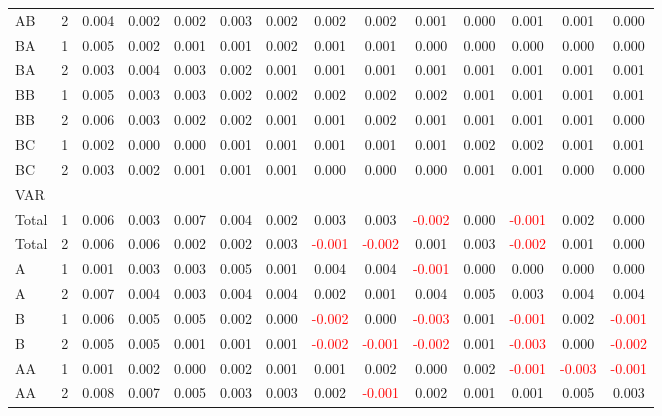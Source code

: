 \begin{table}[H]
{\begin{tabular}{llcccccccccccc}
AB & 2 & 0.004 & 0.002 & 0.002 & 0.003 & 0.002 & 0.002 & 0.002 & 0.001 & 0.000 & 0.001 & 0.001 & 0.000\\
BA & 1 & 0.005 & 0.002 & 0.001 & 0.001 & 0.002 & 0.001 & 0.001 & 0.000 & 0.000 & 0.000 & 0.000 & 0.000\\
BA & 2 & 0.003 & 0.004 & 0.003 & 0.002 & 0.001 & 0.001 & 0.001 & 0.001 & 0.001 & 0.001 & 0.001 & 0.001\\
BB & 1 & 0.005 & 0.003 & 0.003 & 0.002 & 0.002 & 0.002 & 0.002 & 0.002 & 0.001 & 0.001 & 0.001 & 0.001\\
BB & 2 & 0.006 & 0.003 & 0.002 & 0.002 & 0.001 & 0.001 & 0.002 & 0.001 & 0.001 & 0.001 & 0.001 & 0.000\\
BC & 1 & 0.002 & 0.000 & 0.000 & 0.001 & 0.001 & 0.001 & 0.001 & 0.001 & 0.002 & 0.002 & 0.001 & 0.001\\
BC & 2 & 0.003 & 0.002 & 0.001 & 0.001 & 0.001 & 0.000 & 0.000 & 0.000 & 0.001 & 0.001 & 0.000 & 0.000\\
\hline
VAR &  &  &  &  &  &  &  &  &  &  &  &  & \\
\hline
Total & 1 & 0.006 & 0.003 & 0.007 & 0.004 & 0.002 & 0.003 & 0.003 & \textcolor{red}{-0.002} & 0.000 & \textcolor{red}{-0.001} & 0.002 & 0.000\\
Total & 2 & 0.006 & 0.006 & 0.002 & 0.002 & 0.003 & \textcolor{red}{-0.001} & \textcolor{red}{-0.002} & 0.001 & 0.003 & \textcolor{red}{-0.002} & 0.001 & 0.000\\
A & 1 & 0.001 & 0.003 & 0.003 & 0.005 & 0.001 & 0.004 & 0.004 & \textcolor{red}{-0.001} & 0.000 & 0.000 & 0.000 & 0.000\\
A & 2 & 0.007 & 0.004 & 0.003 & 0.004 & 0.004 & 0.002 & 0.001 & 0.004 & 0.005 & 0.003 & 0.004 & 0.004\\
B & 1 & 0.006 & 0.005 & 0.005 & 0.002 & 0.000 & \textcolor{red}{-0.002} & 0.000 & \textcolor{red}{-0.003} & 0.001 & \textcolor{red}{-0.001} & 0.002 & \textcolor{red}{-0.001}\\
B & 2 & 0.005 & 0.005 & 0.001 & 0.001 & 0.001 & \textcolor{red}{-0.002} & \textcolor{red}{-0.001} & \textcolor{red}{-0.002} & 0.001 & \textcolor{red}{-0.003} & 0.000 & \textcolor{red}{-0.002}\\
AA & 1 & 0.001 & 0.002 & 0.000 & 0.002 & 0.001 & 0.001 & 0.002 & 0.000 & 0.002 & \textcolor{red}{-0.001} & \textcolor{red}{-0.003} & \textcolor{red}{-0.001}\\
AA & 2 & 0.008 & 0.007 & 0.005 & 0.003 & 0.003 & 0.002 & \textcolor{red}{-0.001} & 0.002 & 0.001 & 0.001 & 0.005 & 0.003\\

\end{tabular}}
\end{table}
